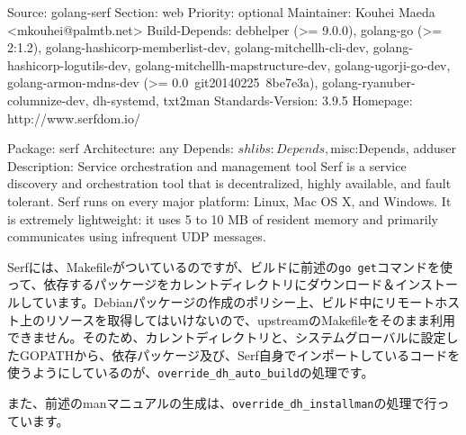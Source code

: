 \documentclass[mingoth,a4paper]{jsarticle}
\begin{document}
\begin{commandline}
Source: golang-serf
Section: web
Priority: optional
Maintainer: Kouhei Maeda <mkouhei@palmtb.net>
Build-Depends: debhelper (>= 9.0.0),
        golang-go (>= 2:1.2),
        golang-hashicorp-memberlist-dev,
        golang-mitchellh-cli-dev,
        golang-hashicorp-logutils-dev,
        golang-mitchellh-mapstructure-dev,
        golang-ugorji-go-dev,
        golang-armon-mdns-dev (>= 0.0~git20140225~8be7e3a),
        golang-ryanuber-columnize-dev,
        dh-systemd,
        txt2man
Standards-Version: 3.9.5
Homepage: http://www.serfdom.io/

Package: serf
Architecture: any
Depends: ${shlibs:Depends}, ${misc:Depends}, adduser
Description: Service orchestration and management tool
 Serf is a service discovery and orchestration tool that is decentralized,
 highly available, and fault tolerant. Serf runs on every major platform:
 Linux, Mac OS X, and Windows. It is extremely lightweight: it uses 5 to 10 MB
 of resident memory and primarily communicates using infrequent UDP messages.
\end{commandline}


Serfには、Makefileがついているのですが、ビルドに前述の\texttt{go get}コマンドを使って、依存するパッケージをカレントディレクトリにダウンロード＆インストールしています。Debianパッケージの作成のポリシー上、ビルド中にリモートホスト上のリソースを取得してはいけないので、upstreamのMakefileをそのまま利用できません。そのため、カレントディレクトリと、システムグローバルに設定したGOPATHから、依存パッケージ及び、Serf自身でインポートしているコードを使うようにしているのが、\texttt{override\_dh\_auto\_build}の処理です。

また、前述のmanマニュアルの生成は、\texttt{override\_dh\_installman}の処理で行っています。
\end{document}
